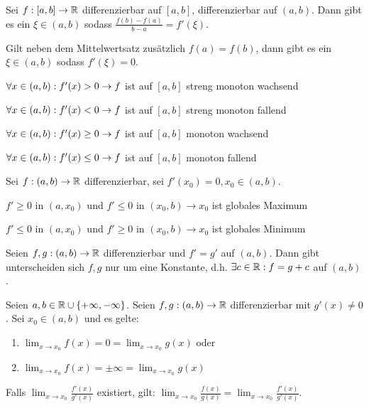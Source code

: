 \documentclass[]{article}
\begin{document}
\begin{satz}[Mittelwertsatz]
	Sei $f : [a,b] \rightarrow \mathbb{R}$ differenzierbar auf $[a,b]$, differenzierbar auf $(a,b)$. Dann gibt es ein $\xi \in (a,b)$ sodass $\frac{f(b) - f(a)}{b - a} = f'(\xi)$.
\end{satz}

\begin{satz}
	Gilt neben dem Mittelwertsatz zusätzlich $f(a) = f(b)$, dann gibt es ein $\xi \in (a,b)$ sodass $f'(\xi) = 0$.
\end{satz}

\begin{satz}
	\begin{description}[noitemsep]
		\item $\forall x \in (a,b): f'(x) > 0 \rightarrow f$ ist auf $[a,b]$ streng monoton wachsend
		\item $\forall x \in (a,b): f'(x) < 0 \rightarrow f$ ist auf $[a,b]$ streng monoton fallend
		\item $\forall x \in (a,b): f'(x) \geq 0 \rightarrow f$ ist auf $[a,b]$ monoton wachsend
		\item $\forall x \in (a,b): f'(x) \leq 0 \rightarrow f$ ist auf $[a,b]$ monoton fallend
	\end{description}
\end{satz}

\begin{satz}
	Sei $f : (a,b) \rightarrow \mathbb{R}$ differenzierbar, sei $f'(x_0) = 0, x_0 \in (a,b)$.
	\begin{description}[noitemsep]
		\item $f' \geq 0$ in $(a, x_0)$ und $f' \leq 0$ in $(x_0, b) \rightarrow x_0$ ist globales Maximum
		\item $f' \leq 0$ in $(a, x_0)$ und $f' \geq 0$ in $(x_0, b) \rightarrow x_0$ ist globales Minimum
	\end{description}
\end{satz}

\begin{satz}
	Seien $f,g : (a,b) \rightarrow \mathbb{R}$ differenzierbar und $f' = g'$ auf $(a,b)$. Dann gibt unterscheiden sich $f,g$ nur um eine Konstante, d.h. $\exists c \in \mathbb{R} : f = g + c$ auf $(a,b)$.
\end{satz}

\begin{satz}[L'Hospital]
	Seien $a,b \in \mathbb{R} \cup \{+ \infty, - \infty\}$. Seien $f, g : (a,b) \rightarrow \mathbb{R}$ differenzierbar mit $g'(x) \neq 0$. Sei $x_0 \in (a,b)$ und es gelte:
	\begin{enumerate}[noitemsep]
		\item $\lim_{x \rightarrow x_0} f(x) = 0 = \lim_{x \rightarrow x_0} g(x)$ oder
		\item$\lim_{x \rightarrow x_0} f(x) = \pm \infty = \lim_{x \rightarrow x_0} g(x)$
	\end{enumerate}
	Falls $\lim_{x \rightarrow x_0} \frac{f'(x)}{g'(x)}$ existiert, gilt: $\lim_{x \rightarrow x_0} \frac{f(x)}{g(x)} = \lim_{x \rightarrow x_0} \frac{f'(x)}{g'(x)}$.
\end{satz}
\end{document}
